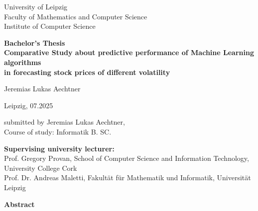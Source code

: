 \documentclass[a4paper,12pt]{report}
\begin{document}
\thispagestyle{empty}

\begin{center}
  \large
University of Leipzig\\
Faculty of Mathematics and Computer Science\\[0.3cm]
Institute of Computer Science
\end{center}

\vspace{3cm}

\begin{center}
  \LARGE\bfseries
  Bachelor's Thesis\\[1cm]
  Comparative Study about predictive performance of Machine Learning algorithms\\
  in forecasting stock prices of different volatility
\end{center}

\vspace{3cm}

\begin{center}
  \large
  Jeremias Lukas Aechtner
\end{center}

\vfill

\noindent
\begin{minipage}[t]{0.5\textwidth}
  Leipzig, 07.2025
\end{minipage}%
\begin{minipage}[t]{0.5\textwidth}
  \raggedleft
  submitted by Jeremias Lukas Aechtner,\\
  Course of study: Informatik B. SC.
\end{minipage}

\vspace{2cm}

\noindent
\begin{minipage}[t]{\textwidth}
  \small
  \textbf{Supervising university lecturer:}\\
  Prof. Gregory Provan, School of Computer Science and Information Technology, University College Cork\\
  Prof. Dr. Andreas Maletti, Fakultät für Mathematik und Informatik, Universität Leipzig
\end{minipage}


\newpage
\vspace*{\fill}

{\fontsize{20}{23}\selectfont\textbf{Abstract}}\\\\\\\\
\end{document}
